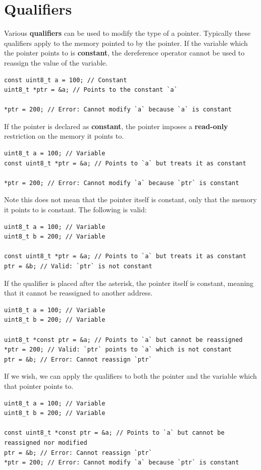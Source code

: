 \documentclass[a4paper]{report}
\begin{document}
\section{Qualifiers}
Various \textbf{qualifiers} can be used to modify the type of a pointer.
Typically these qualifiers apply to the memory pointed to by the pointer.
If the variable which the pointer points to is \textbf{constant}, the dereference operator
cannot be used to reassign the value of the variable.
\begin{verbatim}
const uint8_t a = 100; // Constant
uint8_t *ptr = &a; // Points to the constant `a`

*ptr = 200; // Error: Cannot modify `a` because `a` is constant
\end{verbatim}
If the pointer is declared as \textbf{constant}, the pointer imposes
a \textbf{read-only} restriction on the memory it points to.
\begin{verbatim}
uint8_t a = 100; // Variable
const uint8_t *ptr = &a; // Points to `a` but treats it as constant

*ptr = 200; // Error: Cannot modify `a` because `ptr` is constant
\end{verbatim}
Note this does not mean that the pointer itself is constant, only that the memory it points to is constant.
The following is valid:
\begin{verbatim}
uint8_t a = 100; // Variable
uint8_t b = 200; // Variable

const uint8_t *ptr = &a; // Points to `a` but treats it as constant
ptr = &b; // Valid: `ptr` is not constant
\end{verbatim}
If the qualifier is placed after the asterisk, the pointer itself is constant, meaning that
it cannot be reassigned to another address.
\begin{verbatim}
uint8_t a = 100; // Variable
uint8_t b = 200; // Variable

uint8_t *const ptr = &a; // Points to `a` but cannot be reassigned
*ptr = 200; // Valid: `ptr` points to `a` which is not constant
ptr = &b; // Error: Cannot reassign `ptr`
\end{verbatim}
If we wish, we can apply the qualifiers to both the pointer and the variable which that pointer points to.
\begin{verbatim}
uint8_t a = 100; // Variable
uint8_t b = 200; // Variable

const uint8_t *const ptr = &a; // Points to `a` but cannot be reassigned nor modified
ptr = &b; // Error: Cannot reassign `ptr`
*ptr = 200; // Error: Cannot modify `a` because `ptr` is constant
\end{verbatim}
\end{document}
